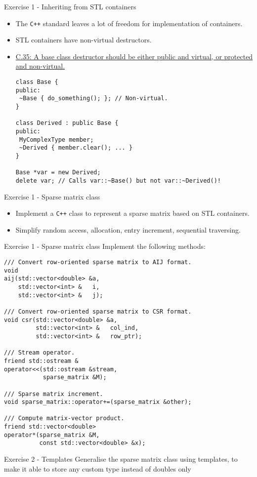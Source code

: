 \documentclass[10pt]{beamer}
\begin{document}
\begin{frame}[fragile]{Exercise 1 - Inheriting from STL containers}
\begin{itemize}
\item The \texttt{C++} standard leaves a lot of freedom for implementation of containers.
\item STL containers have non-virtual destructors.
\item \href{http://isocpp.github.io/CppCoreGuidelines/CppCoreGuidelines\#Rc-dtor-virtual}{C.35: A base class destructor should be either public and virtual, or protected and non-virtual.}
\small\begin{lstlisting}
class Base {
public:
 ~Base { do_something(); }; // Non-virtual.
}

class Derived : public Base {
public:
 MyComplexType member;
 ~Derived { member.clear(); ... }
}

Base *var = new Derived;
delete var; // Calls var::~Base() but not var::~Derived()!
\end{lstlisting}\normalsize
\end{itemize}
\end{frame}


\begin{frame}[fragile]{Exercise 1 - Sparse matrix class}
\begin{itemize}
\item Implement a \texttt{C++} class to represent a sparse matrix based on STL containers.
\item Simplify random access, allocation, entry increment, sequential traversing.
\end{itemize}
\end{frame}


\begin{frame}[fragile]{Exercise 1 - Sparse matrix class}
Implement the following methods:
\begin{lstlisting}[basicstyle=\footnotesize]
/// Convert row-oriented sparse matrix to AIJ format.
void
aij(std::vector<double> &a,
    std::vector<int> &   i,
    std::vector<int> &   j);

/// Convert row-oriented sparse matrix to CSR format.
void csr(std::vector<double> &a,
         std::vector<int> &   col_ind,
         std::vector<int> &   row_ptr);

/// Stream operator.
friend std::ostream &
operator<<(std::ostream &stream,
           sparse_matrix &M);

/// Sparse matrix increment.
void sparse_matrix::operator+=(sparse_matrix &other);

/// Compute matrix-vector product.
friend std::vector<double>
operator*(sparse_matrix &M,
          const std::vector<double> &x);
\end{lstlisting}
\end{frame}

\begin{frame}[fragile]{Exercise 2 - Templates}
	Generalise the sparse matrix class using templates, to make it able to store any custom type instead of {\ttfamily double}s only
\end{frame}
\end{document}
